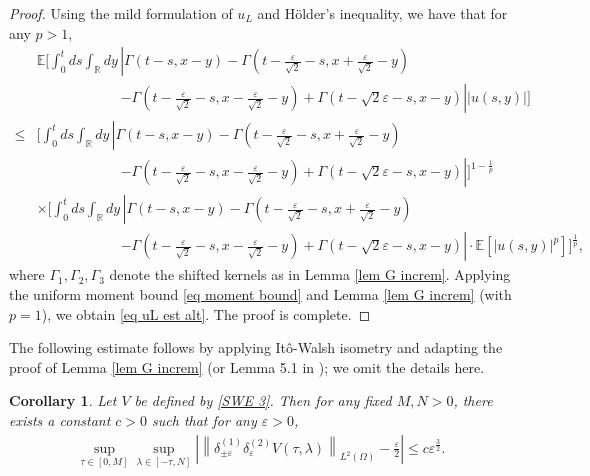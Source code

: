 \documentclass[11pt,reqno]{amsart}
\numberwithin{equation}{section}
\newtheorem{corollary}[theorem]{Corollary}
\newcommand{\1}{{\bf 1}}
\newcommand{\2}{{\bf 2}}
\begin{document}
\begin{proof}
         Using the mild formulation of $u_L$ and   H\"older's inequality,    we have that   for any $p>1$,
 \begin{align*}
 & \mathbb E\Bigg[\int_0^t  ds \int_{\mathbb R}  dy \,   \left| \Gamma(t-s, x-y) - \Gamma \left(t - \frac{\varepsilon}{\sqrt{2}} - s, x + \frac{\varepsilon}{\sqrt{2}} - y\right) \right. \\
&\qquad\qquad \qquad \left. - \Gamma \left(t - \frac{\varepsilon}{\sqrt{2}} - s, x - \frac{\varepsilon}{\sqrt{2}} - y\right) 
+ \Gamma\left(t - \sqrt{2}\varepsilon - s, x - y\right) \right|   |u(s, y)|\Bigg]\\
\le &\Bigg[\int_0^t  ds \int_{\mathbb R}  dy \,   \left| \Gamma(t-s, x-y) - \Gamma \left(t - \frac{\varepsilon}{\sqrt{2}} - s, x + \frac{\varepsilon}{\sqrt{2}} - y\right) \right. \\
&\qquad\qquad \qquad \left. - \Gamma \left(t - \frac{\varepsilon}{\sqrt{2}} - s, x - \frac{\varepsilon}{\sqrt{2}} - y\right) 
  + \Gamma\left(t - \sqrt{2}\varepsilon - s, x - y\right) \right|  \Bigg]^{1-\frac1p}\\
& \times \Bigg[\int_0^t  ds \int_{\mathbb R}  dy \,   \left| \Gamma(t-s, x-y) - \Gamma \left(t - \frac{\varepsilon}{\sqrt{2}} - s, x + \frac{\varepsilon}{\sqrt{2}} - y\right) \right. \\
&\qquad\qquad \qquad \left. - \Gamma \left(t - \frac{\varepsilon}{\sqrt{2}} - s, x - \frac{\varepsilon}{\sqrt{2}} - y\right) 
+ \Gamma\left(t - \sqrt{2}\varepsilon - s, x - y\right) \right|  \cdot \mathbb E\left[|u(s,y)|^p\right] \Bigg]^{\frac1p},
 \end{align*}  
 where $\Gamma_1, \Gamma_2, \Gamma_3$ denote the shifted kernels as in Lemma \ref{lem G increm}.
           Applying  the uniform moment bound  \eqref{eq moment bound} and  Lemma \ref{lem G increm} (with $p=1$), we obtain \eqref{eq uL est alt}.
                The proof is complete. 
  \end{proof}
  
    
 
   The following  estimate follows by applying  It\^o-Walsh isometry and  adapting the proof  of  Lemma \ref{lem G increm} (or  Lemma 5.1 in   \cite{CL25}); we omit   the details here. 
   \begin{corollary}\label{coro V}    Let $V$ be defined  by \eqref{SWE 3}.     Then  for any fixed $M, N>0$,  there exists a constant $c>0$ such that  for any   $\varepsilon>0$, 
  \begin{equation}\label{eq V est}
        \begin{split}
         \sup_{\tau\in [0,M]}\sup_{\lambda\in [-\tau, N]}  \left|  \left\|    \delta_{\pm\varepsilon}^{(1)}\delta_{\varepsilon}^{(2)}V(\tau, \lambda) \right\|_{L^2(\Omega)}-\frac{\varepsilon}{2}\right| \le c  \varepsilon^{\frac{3}{2}}. 
    \end{split}
    \end{equation}      
    \end{corollary}
        
\end{document}
